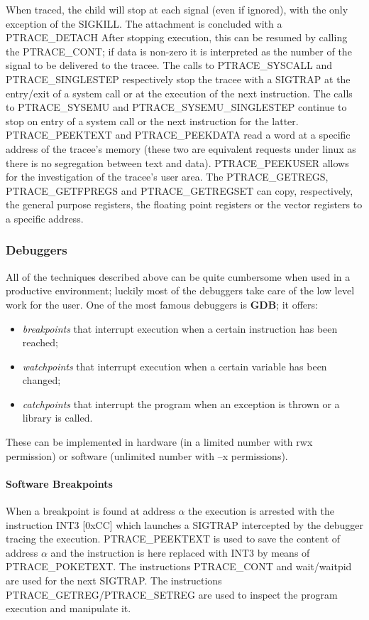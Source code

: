 When traced, the child will stop at each signal (even if ignored), with the only exception of the {\ttfamily SIGKILL}.
The attachment is concluded with a {\ttfamily PTRACE\_DETACH}
After stopping execution, this can be resumed by calling the {\ttfamily PTRACE\_CONT}; if data is non-zero it is
interpreted as the number of the signal to be delivered to the tracee.
The calls to {\ttfamily PTRACE\_SYSCALL} and {\ttfamily PTRACE\_SINGLESTEP} respectively stop the tracee with a
{\ttfamily SIGTRAP} at the entry/exit of a system call or at the execution of the next instruction.
The calls to {\ttfamily PTRACE\_SYSEMU} and {\ttfamily PTRACE\_SYSEMU\_SINGLESTEP} continue to stop on entry of a system
call or the next instruction for the latter.
{\ttfamily PTRACE\_PEEKTEXT} and {\ttfamily PTRACE\_PEEKDATA} read a word at a specific address of the tracee's memory
(these two are equivalent requests under linux as there is no segregation between text and data).
{\ttfamily PTRACE\_PEEKUSER} allows for the investigation of the tracee's user area.
The {\ttfamily PTRACE\_GETREGS}, {\ttfamily PTRACE\_GETFPREGS} and {\ttfamily PTRACE\_GETREGSET} can copy, respectively,
the general purpose registers, the floating point registers or the vector registers to a specific address.

\subsubsection{Debuggers}
All of the techniques described above can be quite cumbersome when used in a productive environment; luckily most of the
debuggers take care of the low level work for the user. One of the most famous debuggers is \textbf{GDB}; it offers:
\begin{itemize}
    \item \textit{breakpoints} that interrupt execution when a certain instruction has been reached;
    \item \textit{watchpoints} that interrupt execution when a certain variable has been changed;
    \item \textit{catchpoints} that interrupt the program when an exception is thrown or a library is called.
\end{itemize}
These can be implemented in hardware (in a limited number with {\ttfamily rwx} permission) or software (unlimited number
with {\ttfamily --x} permissions).
\paragraph{Software Breakpoints}
When a breakpoint is found at address $\alpha$ the execution is arrested with the instruction {\ttfamily INT3 [0xCC]}
which launches a {\ttfamily SIGTRAP} intercepted by the debugger tracing the execution. {\ttfamily PTRACE\_PEEKTEXT} is
used to save the content of address $\alpha$ and the instruction is here replaced with {\ttfamily INT3} by means of
{PTRACE\_POKETEXT}. The instructions {\ttfamily PTRACE\_CONT} and {\ttfamily wait/waitpid} are used for the next
{\ttfamily SIGTRAP}. The instructions {\ttfamily PTRACE\_GETREG/PTRACE\_SETREG} are used to inspect the program
execution and manipulate it.

